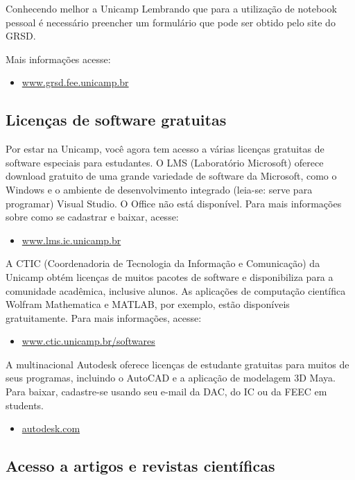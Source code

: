 \begin{story}{Conhecendo melhor a Unicamp}
Lembrando que para a utilização de notebook pessoal é necessário preencher um formulário que pode ser obtido pelo site do GRSD.

Mais informações acesse:

\begin{itemize}
\item \url{www.grsd.fee.unicamp.br}
\end{itemize}

\subsection*{Licenças de software gratuitas}

Por estar na Unicamp, você agora tem acesso a várias licenças gratuitas de software especiais para estudantes. O LMS (Laboratório Microsoft) oferece download gratuito de uma grande variedade de software da Microsoft, como o Windows e o ambiente de desenvolvimento integrado (leia-se: serve para programar) Visual Studio. O Office não está disponível. Para mais informações sobre como se cadastrar e baixar, acesse:

\begin{itemize}
\item \url{www.lms.ic.unicamp.br}
\end{itemize}

A CTIC (Coordenadoria de Tecnologia da Informação e Comunicação) da Unicamp obtém licenças de muitos pacotes de software e disponibiliza para a comunidade acadêmica, inclusive alunos. As aplicações de computação científica Wolfram Mathematica e MATLAB, por exemplo, estão disponíveis gratuitamente. Para mais informações, acesse:

\begin{itemize}
\item \url{www.ctic.unicamp.br/softwares}
\end{itemize}

A multinacional Autodesk oferece licenças de estudante gratuitas para muitos de seus programas, incluindo o AutoCAD e a aplicação de modelagem 3D Maya. Para baixar, cadastre-se usando seu e-mail da DAC, do IC ou da FEEC em students.

\begin{itemize}
\item \url{autodesk.com}
\end{itemize}

\subsection*{Acesso a artigos e revistas científicas}


\end{story}
